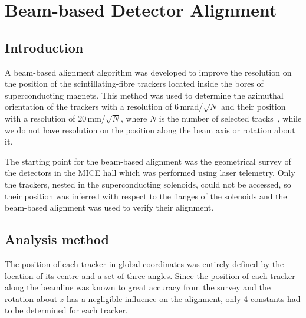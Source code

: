 \graphicspath{{09-Detector-alignment/Figures/}}

\section{Beam-based Detector Alignment}
\label{Sect:DA}

\subsection{Introduction}
\label{SubSect:DA_Intro}

A beam-based alignment algorithm was developed to improve the resolution on the position of the scintillating-fibre trackers located inside the bores of superconducting magnets. This method was used to determine the azimuthal orientation of the trackers with a resolution of 6\,mrad/$\sqrt{N}$ and their position with a resolution of 20\,mm/$\sqrt{N}$, where $N$ is the number of selected tracks~\cite{2018arXiv1805.06623T}, while we do not have resolution on the position along the beam axis or rotation about it.


The starting point for the beam-based alignment was the geometrical survey of the detectors in the MICE hall which was performed using laser telemetry.
Only the trackers, nested in the superconducting solenoids, could not be accessed, so their position was inferred with respect to the flanges of the solenoids and the beam-based alignment was used to verify their alignment.

\subsection{Analysis method}
\label{SubSect:DA_Analysis}

The position of each tracker in global coordinates was entirely defined by the location of its centre and a set of three angles.
Since the position of each tracker along the beamline was known to great accuracy from the survey and the rotation about $z$ has a negligible influence on the alignment, only 4 constants had to be determined for each tracker.

